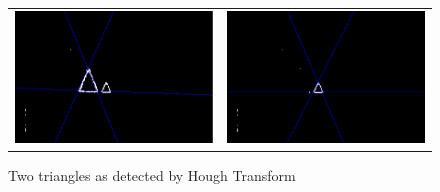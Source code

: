 \def\DevnagVersion{2.15}\documentclass[a4paper, 10pt, notitlepage]{report}
\begin{document}
\begin{figure}[h]
\center
\begin{tabular}{cc}
\includegraphics[scale=0.30]{0002l.png} & 
\includegraphics[scale=0.30]{0002s.png}
\end{tabular}
\label{tab:gt}
\caption{Two triangles as detected by Hough Transform}
\end{figure}
\end{document}

